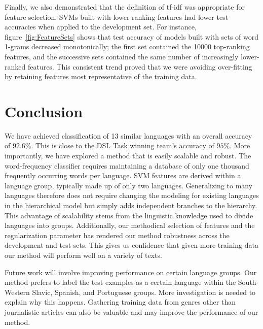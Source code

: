 \documentclass{article}
\begin{document}
Finally, we also demonstrated that the definition of tf-idf was appropriate for feature selection. SVMs built with lower ranking features had lower test accuracies when applied to the development set. For instance, figure~\ref{fig:FeatureSets} shows that test accuracy of models built with sets of word 1-grams decreased monotonically; the first set contained the 10000 top-ranking features, and the successive sets contained the same number of increasingly lower-ranked features. This consistent trend proved that we were avoiding over-fitting by retaining features most representative of the training data.

\section{Conclusion}
We have achieved classification of 13 similar languages with an overall accuracy of $92.6\%$. This is close to the DSL Task winning team's accuracy of $95\%$. More importantly, we have explored a method that is easily scalable and robust. The word-frequency classifier requires maintaining a database of only one thousand frequently occurring words per language. SVM features are derived within a language group, typically made up of only two languages. Generalizing to many languages therefore does not require changing the modeling for existing languages in the hierarchical model but simply adds independent branches to the hierarchy. This advantage of scalability stems from the linguistic knowledge used to divide languages into groups. Additionally, our methodical selection of features and the regularization parameter has rendered our method robustness across the development and test sets. This gives us confidence that given more training data our method will perform well on a variety of texts.

Future work will involve improving performance on certain language groups. Our method prefers to label the test examples as a certain language within the South-Western Slavic, Spanish, and Portuguese groups. More investigation is needed to explain why this happens. Gathering training data from genres other than journalistic articles can also be valuable and may improve the performance of our method. 


\newpage
\end{document}
